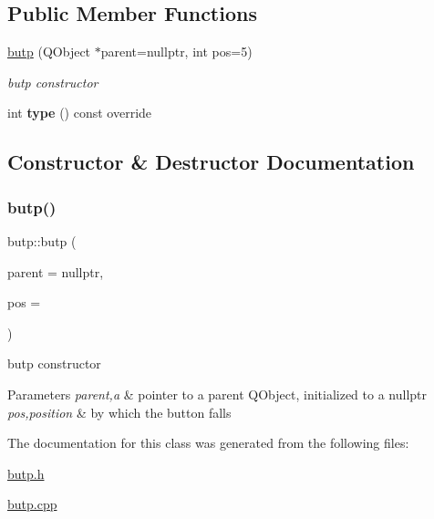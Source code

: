 \subsection*{Public Member Functions}
\begin{DoxyCompactItemize}
\item 
\hyperlink{classbutp_abfdbf8481fc25fa88cf2d29b68163041}{butp} (Q\+Object $\ast$parent=nullptr, int pos=5)
\begin{DoxyCompactList}\small\item\em butp constructor \end{DoxyCompactList}\item 
\mbox{\label{classbutp_a4971613be174a28767e439bc46f464c8}} 
int {\bfseries type} () const override
\end{DoxyCompactItemize}


\subsection{Constructor \& Destructor Documentation}
\mbox{\label{classbutp_abfdbf8481fc25fa88cf2d29b68163041}} 
\subsubsection{\texorpdfstring{butp()}{butp()}}
{\footnotesize\ttfamily butp\+::butp (\begin{DoxyParamCaption}\item[{Q\+Object $\ast$}]{parent = {\ttfamily nullptr},  }\item[{int}]{pos = {} }\end{DoxyParamCaption})\hspace{0.3cm}{\ttfamily [explicit]}}



butp constructor 


\begin{DoxyParams}{Parameters}
{\em parent,a} & pointer to a parent Q\+Object, initialized to a nullptr \\
\hline
{\em pos,position} & by which the button falls \\
\hline
\end{DoxyParams}


The documentation for this class was generated from the following files\+:\begin{DoxyCompactItemize}
\item 
\hyperlink{butp_8h}{butp.\+h}\item 
\hyperlink{butp_8cpp}{butp.\+cpp}\end{DoxyCompactItemize}
